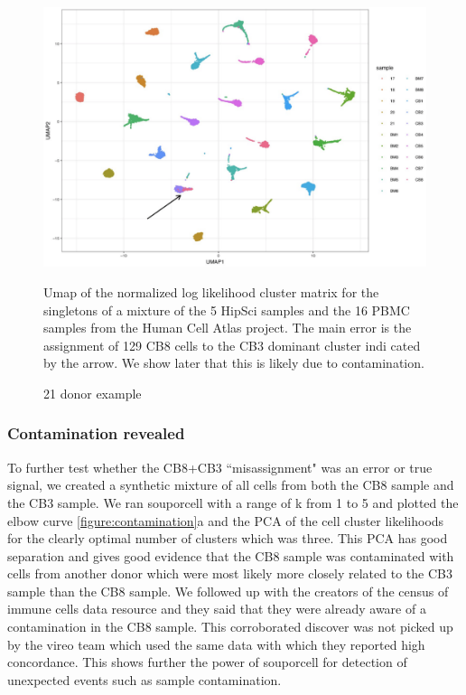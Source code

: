 \begin{figure}[htbp!]
\caption{21 donor example}
\label{figure:21donor}
\begin{centering}

\includegraphics[width=\textwidth]{21donor.png} 
\par{Umap of the normalized log likelihood cluster matrix for the singletons of a mixture of the 5 HipSci samples and the 16 PBMC
samples from the Human Cell Atlas project. The main error is the assignment of 129 CB8 cells to the CB3 dominant cluster indi cated by
the arrow. We show later that this is likely due to contamination.}

\end{centering}
\end{figure}

\subsubsection{Contamination revealed}

To further test whether the CB8+CB3 ``misassignment" was an error or true signal, we created a synthetic mixture of all cells from both the CB8 sample and the CB3 sample. We ran souporcell with a range of k from 1 to 5 and plotted the elbow curve \ref{figure:contamination}a and the PCA of the cell cluster likelihoods for the clearly optimal number of clusters which was three. This PCA has good separation and gives good evidence that the CB8 sample was contaminated with cells from another donor which were most likely more closely related to the CB3 sample than the CB8 sample. We followed up with the creators of the census of immune cells data resource and they said that they were already aware of a contamination in the CB8 sample. This corroborated discover was not picked up by the vireo team which used the same data with which they reported high concordance. This shows further the power of souporcell for detection of unexpected events such as sample contamination.

